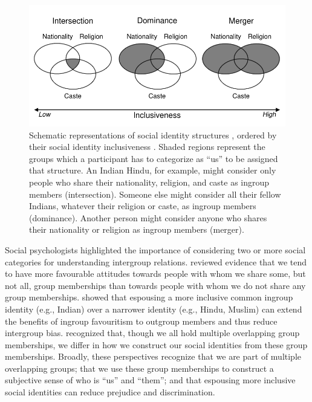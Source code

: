 \documentclass[12pt, a4paper]{article}
\begin{document}
\begin{figure}
\centering
\includegraphics[scale=1]{../figures/figure-1}
\caption{
Schematic representations of social identity structures \protect\cite{roccas_social_2002}, ordered by their social identity inclusiveness \protect\cite{dommelen_construing_2015}. Shaded regions represent the groups which a participant has to categorize as ``us'' to be assigned that structure. An Indian Hindu, for example, might consider only people who share their nationality, religion, and caste as ingroup members (intersection). Someone else might consider all their fellow Indians, whatever their religion or caste, as ingroup members (dominance). Another person might consider anyone who shares their nationality or religion as ingroup members (merger).
}
\label{fig:f1}
\end{figure}

Social psychologists highlighted the importance of considering two \cite{berry_immigration_1997, crisp_multiple_2007, dovidio_commonality_2009} or more \cite{roccas_social_2002} social categories for understanding intergroup relations.  reviewed evidence that we tend to have more favourable attitudes towards people with whom we share some, but not all, group memberships than towards people with whom we do not share any group memberships.  showed that espousing a more inclusive common ingroup identity (e.g., Indian) over a narrower identity (e.g., Hindu, Muslim) can extend the benefits of ingroup favouritism to outgroup members and thus reduce intergroup bias.  recognized that, though we all hold multiple overlapping group memberships, we differ in how we construct our social identities from these group memberships. Broadly, these perspectives recognize that we are part of multiple overlapping groups; that we use these group memberships to construct a subjective sense of who is ``us'' and ``them''; and that espousing more inclusive social identities can reduce prejudice and discrimination.
\end{document}

